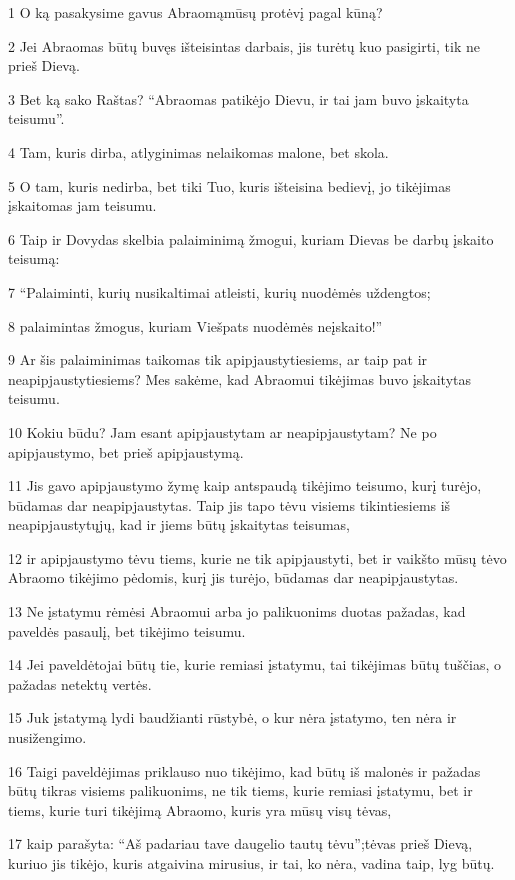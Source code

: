 \par 1 O ką pasakysime gavus Abraomą­mūsų protėvį pagal kūną? 
\par 2 Jei Abraomas būtų buvęs išteisintas darbais, jis turėtų kuo pasigirti, tik ne prieš Dievą. 
\par 3 Bet ką sako Raštas? “Abraomas patikėjo Dievu, ir tai jam buvo įskaityta teisumu”. 
\par 4 Tam, kuris dirba, atlyginimas nelaikomas malone, bet skola. 
\par 5 O tam, kuris nedirba, bet tiki Tuo, kuris išteisina bedievį, jo tikėjimas įskaitomas jam teisumu. 
\par 6 Taip ir Dovydas skelbia palaiminimą žmogui, kuriam Dievas be darbų įskaito teisumą: 
\par 7 “Palaiminti, kurių nusikaltimai atleisti, kurių nuodėmės uždengtos; 
\par 8 palaimintas žmogus, kuriam Viešpats nuodėmės neįskaito!” 
\par 9 Ar šis palaiminimas taikomas tik apipjaustytiesiems, ar taip pat ir neapipjaustytiesiems? Mes sakėme, kad Abraomui tikėjimas buvo įskaitytas teisumu. 
\par 10 Kokiu būdu? Jam esant apipjaustytam ar neapipjaustytam? Ne po apipjaustymo, bet prieš apipjaustymą. 
\par 11 Jis gavo apipjaustymo žymę kaip antspaudą tikėjimo teisumo, kurį turėjo, būdamas dar neapipjaustytas. Taip jis tapo tėvu visiems tikintiesiems iš neapipjaustytųjų, kad ir jiems būtų įskaitytas teisumas, 
\par 12 ir apipjaustymo tėvu tiems, kurie ne tik apipjaustyti, bet ir vaikšto mūsų tėvo Abraomo tikėjimo pėdomis, kurį jis turėjo, būdamas dar neapipjaustytas. 
\par 13 Ne įstatymu rėmėsi Abraomui arba jo palikuonims duotas pažadas, kad paveldės pasaulį, bet tikėjimo teisumu. 
\par 14 Jei paveldėtojai būtų tie, kurie remiasi įstatymu, tai tikėjimas būtų tuščias, o pažadas netektų vertės. 
\par 15 Juk įstatymą lydi baudžianti rūstybė, o kur nėra įstatymo, ten nėra ir nusižengimo. 
\par 16 Taigi paveldėjimas priklauso nuo tikėjimo, kad būtų iš malonės ir pažadas būtų tikras visiems palikuonims, ne tik tiems, kurie remiasi įstatymu, bet ir tiems, kurie turi tikėjimą Abraomo, kuris yra mūsų visų tėvas, 
\par 17 kaip parašyta: “Aš padariau tave daugelio tautų tėvu”;­tėvas prieš Dievą, kuriuo jis tikėjo, kuris atgaivina mirusius, ir tai, ko nėra, vadina taip, lyg būtų. 

